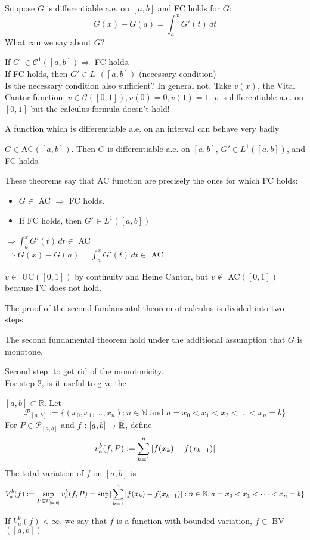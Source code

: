 Suppose \(G\) is differentiable a.e. on \(\left[a, b\right]\) and FC holds for \(G\):
\[
    G(x) - G(a) = \int_a^x G'(t) \, dt
\]
What can we say about \(G\)?
\begin{remark}
    If \(G\) \(\in \mathcal{C}^1(\left[a, b\right]) \Rightarrow\) FC holds. \\
    If FC holds, then \(G' \in L^1(\left[a, b\right]) \) (necessary condition) \\
    Is the necessary condition also sufficient? In general not. 
    Take \(v(x)\), the Vital Cantor function: \(v \in \mathcal{C}([0,1]), v(0)=0, v(1)=1\). \(v\) is differentiable a.e. on \([0,1]\) but the calculus formula doesn't hold!
\end{remark}
\begin{remark}
    A function which is differentiable a.e. on an interval can behave very badly
\end{remark}
\begin{theorem}
    \(G \in \text{AC}([a, b])\). Then \(G\) is differentiable a.e. on \([a, b]\), \(G' \in L^1([a, b])\), and FC holds.
\end{theorem}
\begin{remark}
    These theorems say that AC function are precisely the ones for which FC holds:
    \begin{itemize}
        \item \(G \in \) AC \(\Rightarrow\) FC holds. 
        \item If FC holds, then \(G' \in L^1 ([a, b])\) 
    \end{itemize}
    \(\Rightarrow \int_a^x G'(t) \, dt \in \) AC \\
    \(\Rightarrow G(x) - G(a) = \int_a^x G'(t) \, dt \in \) AC   
\end{remark}
\begin{remark}
    \(v \in \) UC\(([0, 1])\) by continuity and Heine Cantor, but \(v \notin \) AC\(([0, 1])\) because FC does not hold.
\end{remark}

The proof of the second fundamental theorem of calculus is divided into two steps. 
\begin{lemma}
    The second fundamental theorem hold under the additional assumption that \(G\) is monotone.
\end{lemma}
Second step: to get rid of the monotonicity. \\
For step 2, is it useful to give the
\begin{definition}
    \(\left[a, b\right] \subset \mathbb{R}\). Let 
    \[
        \mathcal{P}_{\left[a, b\right]} := \lbrace (x_0, x_1, \dots, x_n): n \in \mathbb{N} \text{ and } a=x_0 < x_1 < x_2 < \dots < x_n = b \rbrace
    \]
    For \(P \in \mathcal{P}_{\left[a, b\right]}\) and \(f: [a, b] \to \overline{\mathbb{R}}\), define
    \[
        v_a^b(f, P) := \sum_{k=1}^n \abs{f(x_k) - f(x_{k-1})}
    \]
    The total variation of \(f \) on \([a, b]\) is 
    \[
        V_a^b (f) := \sup_{P \in \mathcal{P}_{\left[a, b\right]}} v_a^b (f, P)
        = \sup \lbrace \sum_{k=1}^n \abs{f(x_k)-f(x_{k-1})}:n \in \mathbb{N}, a=x_0 < x_1 < \dots <x_n = b \rbrace
    \]
\end{definition}
If \(V_a^b(f) < \infty\), we say that \(f\) is a function with bounded variation, \(f \in \) BV \(([a, b])\)